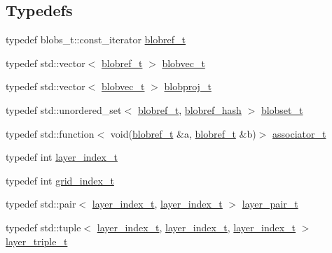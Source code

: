 \subsection*{Typedefs}
\begin{DoxyCompactItemize}
\item 
typedef blobs\+\_\+t\+::const\+\_\+iterator \hyperlink{namespace_wire_cell_1_1_ray_grid_abed76699c704f53d6c4ce912da18050b}{blobref\+\_\+t}
\item 
typedef std\+::vector$<$ \hyperlink{namespace_wire_cell_1_1_ray_grid_abed76699c704f53d6c4ce912da18050b}{blobref\+\_\+t} $>$ \hyperlink{namespace_wire_cell_1_1_ray_grid_a3154c64db4d07056418dfcd1afbf0531}{blobvec\+\_\+t}
\item 
typedef std\+::vector$<$ \hyperlink{namespace_wire_cell_1_1_ray_grid_a3154c64db4d07056418dfcd1afbf0531}{blobvec\+\_\+t} $>$ \hyperlink{namespace_wire_cell_1_1_ray_grid_a2495e73e12fdf4e81ffef9d99f8a8e22}{blobproj\+\_\+t}
\item 
typedef std\+::unordered\+\_\+set$<$ \hyperlink{namespace_wire_cell_1_1_ray_grid_abed76699c704f53d6c4ce912da18050b}{blobref\+\_\+t}, \hyperlink{struct_wire_cell_1_1_ray_grid_1_1blobref__hash}{blobref\+\_\+hash} $>$ \hyperlink{namespace_wire_cell_1_1_ray_grid_a3610973c19231cca55e15d0a8055e079}{blobset\+\_\+t}
\item 
typedef std\+::function$<$ void(\hyperlink{namespace_wire_cell_1_1_ray_grid_abed76699c704f53d6c4ce912da18050b}{blobref\+\_\+t} \&a, \hyperlink{namespace_wire_cell_1_1_ray_grid_abed76699c704f53d6c4ce912da18050b}{blobref\+\_\+t} \&b)$>$ \hyperlink{namespace_wire_cell_1_1_ray_grid_a7441e06379a2aef6996c5fae438b797a}{associator\+\_\+t}
\item 
typedef int \hyperlink{namespace_wire_cell_1_1_ray_grid_ab7562e54b58eede813d5b70b5eb85812}{layer\+\_\+index\+\_\+t}
\item 
typedef int \hyperlink{namespace_wire_cell_1_1_ray_grid_ae97b5b26d015cd99f7d4566f3a7310d0}{grid\+\_\+index\+\_\+t}
\item 
typedef std\+::pair$<$ \hyperlink{namespace_wire_cell_1_1_ray_grid_ab7562e54b58eede813d5b70b5eb85812}{layer\+\_\+index\+\_\+t}, \hyperlink{namespace_wire_cell_1_1_ray_grid_ab7562e54b58eede813d5b70b5eb85812}{layer\+\_\+index\+\_\+t} $>$ \hyperlink{namespace_wire_cell_1_1_ray_grid_afb22be32dcc5907267d4b0a75321187c}{layer\+\_\+pair\+\_\+t}
\item 
typedef std\+::tuple$<$ \hyperlink{namespace_wire_cell_1_1_ray_grid_ab7562e54b58eede813d5b70b5eb85812}{layer\+\_\+index\+\_\+t}, \hyperlink{namespace_wire_cell_1_1_ray_grid_ab7562e54b58eede813d5b70b5eb85812}{layer\+\_\+index\+\_\+t}, \hyperlink{namespace_wire_cell_1_1_ray_grid_ab7562e54b58eede813d5b70b5eb85812}{layer\+\_\+index\+\_\+t} $>$ \hyperlink{namespace_wire_cell_1_1_ray_grid_a4a0ec28f63c71de061dcc8ca912f8437}{layer\+\_\+triple\+\_\+t}

\end{DoxyCompactItemize}
